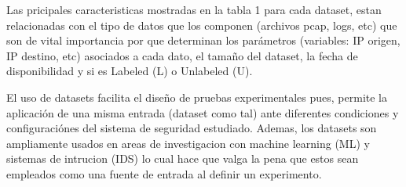 \documentclass[12pt]{article}
\begin{document}
Las pricipales caracteristicas mostradas en la tabla 1 para cada
dataset, estan relacionadas con el tipo de datos que los componen
(archivos pcap, logs, etc) que son de vital importancia por que
determinan los parámetros (variables: IP origen, IP destino, etc)
asociados a cada dato, el tamaño del dataset, la fecha de
disponibilidad y si es Labeled (L) o Unlabeled (U).

 El uso de datasets
facilita el diseño de pruebas experimentales pues, permite la
aplicación de una misma entrada (dataset como tal) ante diferentes
condiciones y configuraciónes del sistema de seguridad
estudiado. Ademas, los datasets son ampliamente usados en areas de
investigacion con machine learning (ML) y sistemas de intrucion (IDS)
\citep{using_kdd} lo cual hace que valga la pena que estos sean
empleados como una fuente de entrada al definir un experimento.

\end{document}
